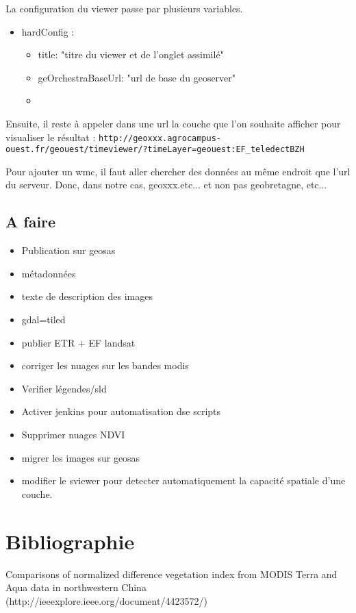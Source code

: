\documentclass[10pt,a4paper]{article}
\begin{document}
La configuration du viewer passe par plusieurs variables.
\begin{itemize}
\item hardConfig :
\begin{itemize}
\item title: "titre du viewer et de l'onglet assimilé"
\item geOrchestraBaseUrl: "url de base du geoserver"
\item 
\end{itemize}
\end{itemize}

Ensuite, il reste à appeler dans une url la couche que l'on souhaite afficher pour visualiser le résultat : \verb!http://geoxxx.agrocampus-ouest.fr/geouest/timeviewer/?timeLayer=geouest:EF_teledectBZH!

Pour ajouter un wmc, il faut aller chercher des données au même endroit que l'url du serveur. Donc, dans notre cas, geoxxx.etc... et non pas geobretagne, etc...
\subsection{A faire}
\begin{itemize}
\item Publication sur geosas
\item métadonnées
\item texte de description des images
\item gdal=tiled
\item publier ETR + EF landsat
\item corriger les nuages sur les bandes modis
\item Verifier légendes/sld
\item Activer jenkins pour automatisation dse scripts
\item Supprimer nuages NDVI
\item migrer les images sur geosas
\item modifier le sviewer pour detecter automatiquement la capacité spatiale d'une couche.
\end{itemize}
\section{Bibliographie}

Comparisons of normalized difference vegetation index from MODIS Terra and Aqua data in northwestern China (http://ieeexplore.ieee.org/document/4423572/)
\end{document}

